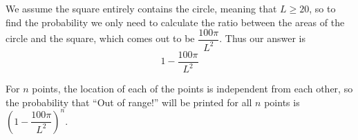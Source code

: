 \documentclass{assignment-263}
\begin{document}
\begin{enumerate}
\begin{enumerate}





    We assume the square entirely contains the circle, meaning that \(L \geq 20\), so to find the probability we only need to calculate the ratio between the areas of the circle and the square, which comes out to be \(\dfrac{100\pi}{L^2}\). Thus our answer is
    \[
      1 - \dfrac{100\pi}{L^2}
    \]

    For \(n\) points, the location of each of the points is independent from each other, so the probability that ``Out of range!'' will be printed for all \(n\) points is \(\left( 1 - \dfrac{100\pi}{L^2} \right)^n\).
    

\end{enumerate}
\end{enumerate}
\end{document}
